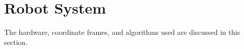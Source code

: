 \section{ Robot System }

The hardware, coordinate frames, and algorithms used are discussed in this section.



% 



